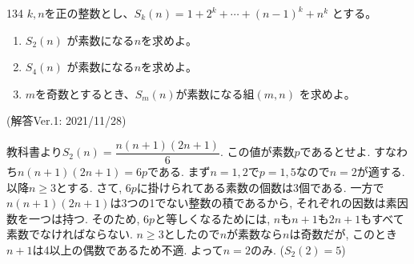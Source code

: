 \begin{thm}{134}{}{}
 $k, n$を正の整数とし、$S_k(n)=1+2^k+\cdots+(n-1)^k+n^k$ とする。
 \begin{enumerate}
  \item $S_2(n)$ が素数になる$n$を求めよ。 
  \item $S_4(n)$ が素数になる$n$を求めよ。 
  \item $m$を奇数とするとき、$S_m(n)$が素数になる組$(m,n)$ を求めよ。 
 \end{enumerate}
\end{thm}
(解答Ver.1: 2021/11/28)


教科書より$S_2(n) = \dfrac{n(n+1)(2n+1)}{6}$. この値が素数$p$であるとせよ. すなわち$n(n+1)(2n+1) = 6p$である. まず$n=1,2$で$p=1,5$なので$n=2$が適する. 以降$n\geq 3$とする. さて, $6p$に掛けられてある素数の個数は3個である. 一方で$n(n+1)(2n+1)$は3つの1でない整数の積であるから, それぞれの因数は素因数を一つは持つ. そのため, $6p$と等しくなるためには, $n$も$n+1$も$2n+1$もすべて素数でなければならない. $n\geq 3$としたので$n$が素数なら$n$は奇数だが, このとき$n+1$は4以上の偶数であるため不適. よって$n=2$のみ. ($S_2(2)=5$)

